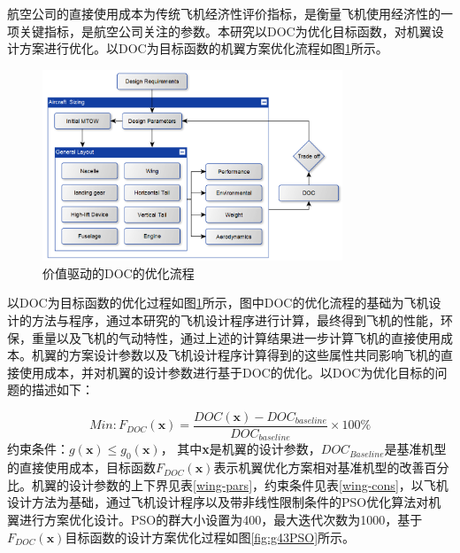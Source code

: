 \documentclass[12pt,a4paper]{report}
\begin{document}
航空公司的直接使用成本为传统飞机经济性评价指标，是衡量飞机使用经济性的一项关键指标，是航空公司关注的参数。本研究以DOC为优化目标函数，对机翼设计方案进行优化。以DOC为目标函数的机翼方案优化流程如图\ref{fig:vdd-process}所示。

\begin{figure}[ht!]
	\centering
		\includegraphics[width=0.8\textwidth]{./media4/image10.png}
		\caption{价值驱动的DOC的优化流程}
		\label{fig:vdd-process}
	
\end{figure}

以DOC为目标函数的优化过程如图\ref{fig:vdd-process}所示，图中DOC的优化流程的基础为飞机设计的方法与程序，通过本研究的飞机设计程序进行计算，最终得到飞机的性能，环保，重量以及飞机的气动特性，通过上述的计算结果进一步计算飞机的直接使用成本。机翼的方案设计参数以及飞机设计程序计算得到的这些属性共同影响飞机的直接使用成本，并对机翼的设计参数进行基于DOC的优化。以DOC为优化目标的问题的描述如下：

\begin{equation}
Min: F_{DOC}(\textbf{x})=\frac{DOC(\textbf{x})-DOC_{baseline}}{DOC_{baseline}} \times 100\%
\end{equation}
约束条件：$g(\textbf{x})\le g_0(\textbf{x})$，
其中\textbf{x}是机翼的设计参数，$DOC_{Baseline}$是基准机型的直接使用成本，目标函数${{F}_{DOC}}(\textbf{x})$表示机翼优化方案相对基准机型的改善百分比。机翼的设计参数的上下界见表\ref{wing-pars}，约束条件见表\ref{wing-cons}，以飞机设计方法为基础，通过飞机设计程序以及带非线性限制条件的PSO优化算法对机翼进行方案优化设计。PSO的群大小设置为400，最大迭代次数为1000，基于${{F}_{DOC}}(\textbf{x})$目标函数的设计方案优化过程如图\ref{fig:g43PSO}所示。
\end{document}
